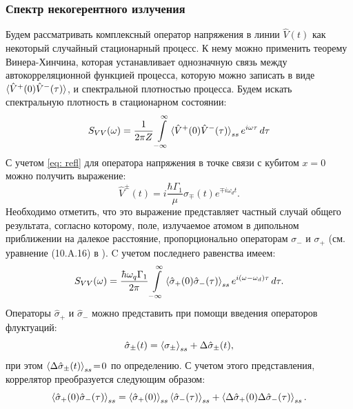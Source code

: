 \subsubsection{Спектр некогерентного излучения}
Будем рассматривать комплексный оператор напряжения в линии $\hat{V}(t)$ как некоторый случайный стационарный процесс. К нему можно применить теорему Винера-Хинчина, которая устанавливает однозначную связь между автокорреляционной функцией процесса, которую можно записать в виде $\braket{\hat{V}^{+}(0)\hat{V}^{-}(\tau)}$, и спектральной плотностью процесса. Будем искать спектральную плотность в стационарном состоянии:  
\begin{equation}
S_{VV}(\omega) = \frac{1}{2\pi Z}\int\limits_{-\infty}^{\infty}\braket{\hat{V}^{+}(0)\hat{V}^{-}(\tau)}_{ss}e^{i\omega \tau}\,d\tau
\end{equation}
С учетом \eqref{eq: refl} для оператора напряжения в точке связи с кубитом $x=0$ можно получить выражение:
\begin{equation}
\hat{V}^{\pm}(t) = i\frac{\hbar\Gamma_1}{\mu}\hat{\sigma}_\mp(t)e^{\mp i\omega_d t}.
\label {eq: sc_field}
\end{equation}
Необходимо отметить, что это выражение представляет частный случай общего результата, согласно которому, поле, излучаемое атомом в дипольном приближении на далекое расстояние, пропорционально операторам $\sigma_-$ и $\sigma_+$ (см. уравнение (10.A.16) в \cite{Scully}).
C учетом последнего равенства имеем:
\begin{equation}
S_{VV}(\omega) = \frac{\hbar\omega_q
	 \Gamma_1}{2\pi}\int\limits_{-\infty}^{\infty}\braket{\hat{\sigma}_{+}(0)\hat{\sigma}_{-}(\tau)}_{ss}e^{i(\omega-\omega_d) \tau}\,d\tau.
\label{eq: SVV_sigmas}
\end{equation}
Операторы $\hat{\sigma}_+$ и $\hat{\sigma}_-$ можно представить при помощи введения операторов флуктуаций:
\begin{equation}
\hat{\sigma}_\pm(t)=\braket{\sigma_\pm}_{ss}+\Delta\hat{\sigma}_\pm(t),
\label{eq: fluct}
\end{equation}
при этом $\braket{\Delta\hat{\sigma}_\pm(t)}_{ss}\!=\!0$ по определению. С учетом этого представления, коррелятор преобразуется следующим образом:
\begin{equation}
\braket{\hat{\sigma}_{+}(0)\hat{\sigma}_{-}(\tau)}_{ss} = \braket{\hat{\sigma}_+(0)}_{ss} \braket{\hat{\sigma}_-(\tau)}_{ss} + \braket{\Delta\hat{\sigma}_{+}(0)\Delta\hat{\sigma}_{-}(\tau)}_{ss}.
\label{eq: correlator}
\end{equation} 
